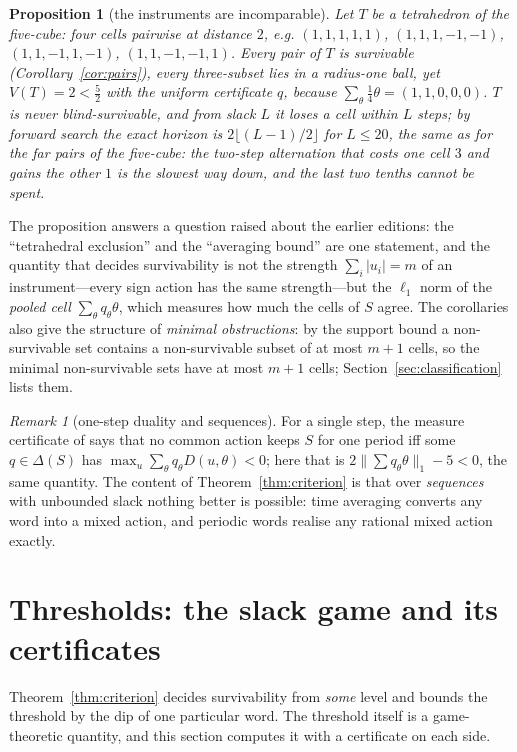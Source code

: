 \documentclass[11pt,a4paper]{article}
\theoremstyle{plain}
\newtheorem{proposition}[theorem]{Proposition}
\theoremstyle{definition}
\theoremstyle{remark}
\newtheorem{remark}[theorem]{Remark}
\newcommand{\tfr}[2]{\tfrac{#1}{#2}}
\begin{document}
\begin{proposition}[the instruments are incomparable]\label{prop:incomparable}
Let $T$ be a tetrahedron of the five-cube: four cells pairwise at distance $2$, e.g. $(1,1,1,1,1)$, $(1,1,1,-1,-1)$, $(1,1,-1,1,-1)$, $(1,1,-1,-1,1)$. Every pair of $T$ is survivable (Corollary~\ref{cor:pairs}), every three-subset lies in a radius-one ball, yet $V(T)=2<\tfr52$ with the uniform certificate $q$, because $\sum_\theta\tfr14\theta=(1,1,0,0,0)$. $T$ is never blind-survivable, and from slack $L$ it loses a cell within $L$ steps; by forward search the exact horizon is $2\lfloor(L-1)/2\rfloor$ for $L\le20$, the same as for the far pairs of the five-cube: the two-step alternation that costs one cell $3$ and gains the other $1$ is the slowest way down, and the last two tenths cannot be spent.
\end{proposition}

The proposition answers a question raised about the earlier editions: the ``tetrahedral exclusion'' and the ``averaging bound'' are one statement, and the quantity that decides survivability is not the strength $\sum_i|u_i|=m$ of an instrument---every sign action has the same strength---but the $\ell_1$ norm of the \emph{pooled cell} $\sum_\theta q_\theta\theta$, which measures how much the cells of $S$ agree. The corollaries also give the structure of \emph{minimal obstructions}: by the support bound a non-survivable set contains a non-survivable subset of at most $m+1$ cells, so the minimal non-survivable sets have at most $m+1$ cells; Section~\ref{sec:classification} lists them.

\begin{remark}[one-step duality and sequences]
For a single step, the measure certificate of \cite{Abaee2026minimax} says that no common action keeps $S$ for one period iff some $q\in\Delta(S)$ has $\max_u\sum_\theta q_\theta D(u,\theta)<0$; here that is $2\|\sum q_\theta\theta\|_1-5<0$, the same quantity. The content of Theorem~\ref{thm:criterion} is that over \emph{sequences} with unbounded slack nothing better is possible: time averaging converts any word into a mixed action, and periodic words realise any rational mixed action exactly.
\end{remark}
\section{Thresholds: the slack game and its certificates}\label{sec:thresholds}

Theorem~\ref{thm:criterion} decides survivability from \emph{some} level and bounds the threshold by the dip of one particular word. The threshold itself is a game-theoretic quantity, and this section computes it with a certificate on each side.
\end{document}
